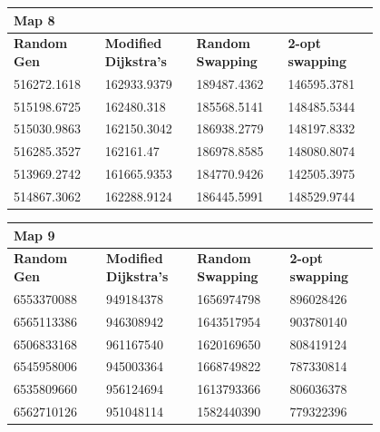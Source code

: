 \documentclass{article}
\begin{document}
\begin{table}[H]
    \centering
    \begin{tabular}{|p{0.2\linewidth}|p{0.2\linewidth}|p{0.2\linewidth}|p{0.2\linewidth}|}
    \hline
        \textbf{Map 8} & ~ & ~ & ~ \\ \hline
        \textbf{Random Gen} & \textbf{Modified Dijkstra's} & \textbf{Random Swapping} & \textbf{2-opt swapping} \\ \hline
        516272.1618 & 162933.9379 & 189487.4362 & 146595.3781 \\ \hline
        515198.6725 & 162480.318 & 185568.5141 & 148485.5344 \\ \hline
        515030.9863 & 162150.3042 & 186938.2779 & 148197.8332 \\ \hline
        516285.3527 & 162161.47 & 186978.8585 & 148080.8074 \\ \hline
        513969.2742 & 161665.9353 & 184770.9426 & 142505.3975 \\ \hline
        514867.3062 & 162288.9124 & 186445.5991 & 148529.9744 \\ \hline
    \end{tabular}
\end{table}

\begin{table}[H]
    \centering
    \begin{tabular}{|p{0.2\linewidth}|p{0.2\linewidth}|p{0.2\linewidth}|p{0.2\linewidth}|}
    \hline
        \textbf{Map 9} & ~ & ~ & ~ \\ \hline
        \textbf{Random Gen} & \textbf{Modified Dijkstra's} & \textbf{Random Swapping} & \textbf{2-opt swapping} \\ \hline
        6553370088 & 949184378 & 1656974798 & 896028426 \\ \hline
        6565113386 & 946308942 & 1643517954 & 903780140 \\ \hline
        6506833168 & 961167540 & 1620169650 & 808419124 \\ \hline
        6545958006 & 945003364 & 1668749822 & 787330814 \\ \hline
        6535809660 & 956124694 & 1613793366 & 806036378 \\ \hline
        6562710126 & 951048114 & 1582440390 & 779322396 \\ \hline
    \end{tabular}
\end{table}
\end{document}
